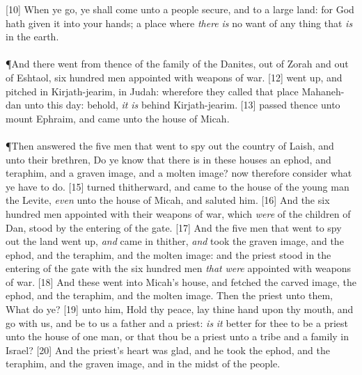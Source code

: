 [10] \textcolor[cmyk]{0.99998,1,0,0}{When ye go, ye shall come unto a people secure, and to a large land: for God hath given it into your hands; a place where \emph{there} \emph{is} no want of any thing that \emph{is} in the earth.}\\
\\
\P \textcolor[cmyk]{0.99998,1,0,0}{And there went from thence of the family of the Danites, out of Zorah and out of Eshtaol, six hundred men appointed with weapons of war.}
[12] \textcolor[cmyk]{0.99998,1,0,0}{ went up, and pitched in Kirjath-jearim, in Judah: wherefore they called that place Mahaneh-dan unto this day: behold, \emph{it} \emph{is} behind Kirjath-jearim.}
[13] \textcolor[cmyk]{0.99998,1,0,0}{ passed thence unto mount Ephraim, and came unto the house of Micah.}\\
\\
\P \textcolor[cmyk]{0.99998,1,0,0}{Then answered the five men that went to spy out the country of Laish, and  unto their brethren, Do ye know that there is in these houses an ephod, and teraphim, and a graven image, and a molten image? now therefore consider what ye have to do.}
[15] \textcolor[cmyk]{0.99998,1,0,0}{ turned thitherward, and came to the house of the young man the Levite, \emph{even} unto the house of Micah, and saluted him.}
[16] \textcolor[cmyk]{0.99998,1,0,0}{And the six hundred men appointed with their weapons of war, which \emph{were} of the children of Dan, stood by the entering of the gate.}
[17] \textcolor[cmyk]{0.99998,1,0,0}{And the five men that went to spy out the land went up, \emph{and} came in thither, \emph{and} took the graven image, and the ephod, and the teraphim, and the molten image: and the priest stood in the entering of the gate with the six hundred men \emph{that} \emph{were} appointed with weapons of war.}
[18] \textcolor[cmyk]{0.99998,1,0,0}{And these went into Micah's house, and fetched the carved image, the ephod, and the teraphim, and the molten image. Then  the priest unto them, What do ye?}
[19] \textcolor[cmyk]{0.99998,1,0,0}{  unto him, Hold thy peace, lay thine hand upon thy mouth, and go with us, and be to us a father and a priest: \emph{is} \emph{it} better for thee to be a priest unto the house of one man, or that thou be a priest unto a tribe and a family in Israel?}
[20] \textcolor[cmyk]{0.99998,1,0,0}{And the priest's heart was glad, and he took the ephod, and the teraphim, and the graven image, and  in the midst of the people.}
